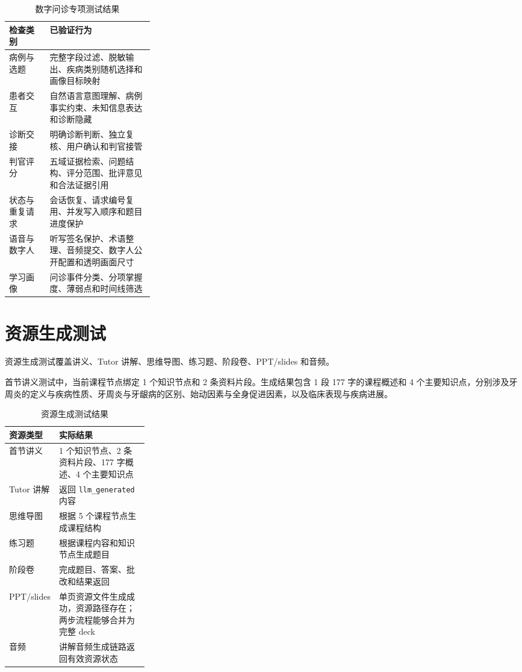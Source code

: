 \begin{table}[H]
  \centering
  \caption{数字问诊专项测试结果}
  \label{tab:clinical-speaking-test}
  \begin{tabularx}{\linewidth}{p{0.28\linewidth}X}
    \toprule
    检查类别 & 已验证行为 \\
    \midrule
    病例与选题 & 完整字段过滤、脱敏输出、疾病类别随机选择和画像目标映射 \\
    患者交互 & 自然语言意图理解、病例事实约束、未知信息表达和诊断隐藏 \\
    诊断交接 & 明确诊断判断、独立复核、用户确认和判官接管 \\
    判官评分 & 五域证据检索、问题结构、评分范围、批评意见和合法证据引用 \\
    状态与重复请求 & 会话恢复、请求编号复用、并发写入顺序和题目进度保护 \\
    语音与数字人 & 听写签名保护、术语整理、音频提交、数字人公开配置和透明画面尺寸 \\
    学习画像 & 问诊事件分类、分项掌握度、薄弱点和时间线筛选 \\
    \bottomrule
  \end{tabularx}
\end{table}

\section{资源生成测试}

资源生成测试覆盖讲义、Tutor 讲解、思维导图、练习题、阶段卷、PPT/slides 和音频。

首节讲义测试中，当前课程节点绑定 1 个知识节点和 2 条资料片段。生成结果包含 1 段 177 字的课程概述和 4 个主要知识点，分别涉及牙周炎的定义与疾病性质、牙周炎与牙龈病的区别、始动因素与全身促进因素，以及临床表现与疾病进展。

\begin{table}[H]
  \centering
  \caption{资源生成测试结果}
  \label{tab:resource-test}
  \begin{tabularx}{\linewidth}{p{0.27\linewidth}X}
    \toprule
    资源类型 & 实际结果 \\
    \midrule
    首节讲义 & 1 个知识节点、2 条资料片段、177 字概述、4 个主要知识点 \\
    Tutor 讲解 & 返回 \texttt{llm\_generated} 内容 \\
    思维导图 & 根据 5 个课程节点生成课程结构 \\
    练习题 & 根据课程内容和知识节点生成题目 \\
    阶段卷 & 完成题目、答案、批改和结果返回 \\
    PPT/slides & 单页资源文件生成成功，资源路径存在；两步流程能够合并为完整 deck \\
    音频 & 讲解音频生成链路返回有效资源状态 \\
    \bottomrule
  \end{tabularx}
\end{table}

